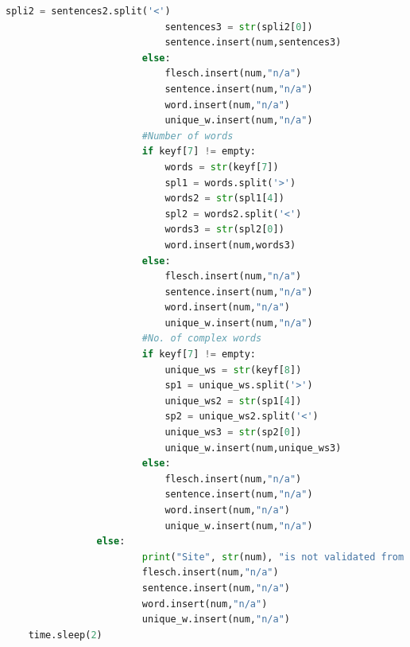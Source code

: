 \documentclass{book}
\begin{document}
\begin{lstlisting}[language=Python]
                            spli2 = sentences2.split('<')
                            sentences3 = str(spli2[0])
                            sentence.insert(num,sentences3)
                        else:
                            flesch.insert(num,"n/a")
                            sentence.insert(num,"n/a")
                            word.insert(num,"n/a")
                            unique_w.insert(num,"n/a")  
                        #Number of words
                        if keyf[7] != empty:
                            words = str(keyf[7])
                            spl1 = words.split('>')
                            words2 = str(spl1[4])
                            spl2 = words2.split('<')
                            words3 = str(spl2[0])
                            word.insert(num,words3)
                        else:
                            flesch.insert(num,"n/a")
                            sentence.insert(num,"n/a")
                            word.insert(num,"n/a")
                            unique_w.insert(num,"n/a")  
                        #No. of complex words
                        if keyf[7] != empty:
                            unique_ws = str(keyf[8])
                            sp1 = unique_ws.split('>')
                            unique_ws2 = str(sp1[4])
                            sp2 = unique_ws2.split('<')
                            unique_ws3 = str(sp2[0])
                            unique_w.insert(num,unique_ws3)
                        else:
                            flesch.insert(num,"n/a")
                            sentence.insert(num,"n/a")
                            word.insert(num,"n/a")
                            unique_w.insert(num,"n/a")  
                else:
                        print("Site", str(num), "is not validated from check 2")
                        flesch.insert(num,"n/a")
                        sentence.insert(num,"n/a")
                        word.insert(num,"n/a")
                        unique_w.insert(num,"n/a")            
    time.sleep(2)
\end{lstlisting}
\end{document}
